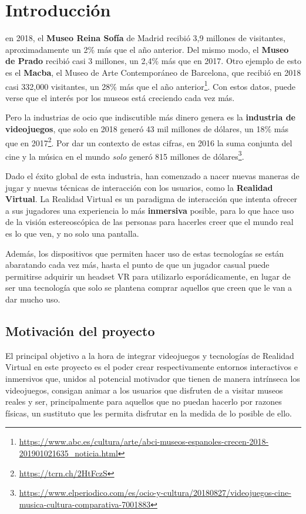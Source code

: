 \chapter{Introducción}
\label{chap:introduccion}

 en 2018, el \textbf{Museo Reina Sofía} de Madrid recibió 3,9 millones de visitantes, aproximadamente un 2\% más que el año anterior. Del mismo modo, el \textbf{Museo de Prado} recibió casi 3 millones, un 2,4\% más que en 2017. Otro ejemplo de esto es el \textbf{Macba}, el Museo de Arte Contemporáneo de Barcelona, que recibió en 2018 casi 332,000 visitantes, un 28\% más que el año anterior\footnote{\url{https://www.abc.es/cultura/arte/abci-museos-espanoles-crecen-2018-201901021635_noticia.html}}. Con estos datos, puede verse que el interés por los museos está creciendo cada vez más.

Pero la industrias de ocio que indiscutible más dinero genera es la \textbf{industria de videojuegos}, que solo en 2018 generó 43 mil millones de dólares, un 18\% más que en 2017\footnote{\url{https://tcrn.ch/2HtFczS}}. Por dar un contexto de estas cifras, en 2016 la suma conjunta del cine y la música en el mundo \textit{solo} generó 815 millones de dólares\footnote{\url{https://www.elperiodico.com/es/ocio-y-cultura/20180827/videojuegos-cine-musica-cultura-comparativa-7001883}}.

Dado el éxito global de esta industria, han comenzado a nacer nuevas maneras de jugar y nuevas técnicas de interacción con los usuarios, como la \textbf{Realidad Virtual}. La Realidad Virtual es un paradigma de interacción que intenta ofrecer a sus jugadores una experiencia lo más \textbf{inmersiva} posible, para lo que hace uso de la visión estereoscópica de las personas para hacerles creer que el mundo real es lo que ven, y no solo una pantalla.

Además, los dispositivos que permiten hacer uso de estas tecnologías se están abaratando cada vez más, hasta el punto de que un jugador casual puede permitirse adquirir un headset \acs{VR} para utilizarlo esporádicamente, en lugar de ser una tecnología que solo se plantena comprar aquellos que creen que le van a dar mucho uso.

\section{Motivación del proyecto}

El principal objetivo a la hora de integrar videojuegos y tecnologías de Realidad Virtual en este proyecto es el poder crear respectivamente entornos interactivos e inmersivos que, unidos al potencial motivador que tienen de manera intrínseca los videojuegos, consigan animar a los usuarios que disfruten de \MineRVa a visitar museos reales y ser, principalmente para aquellos que no puedan hacerlo por razones físicas, un sustituto que les permita disfrutar en la medida de lo posible de ello. 

